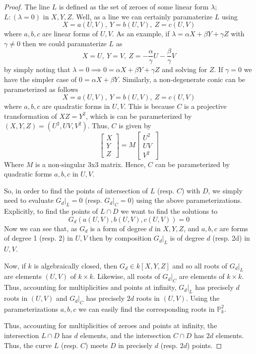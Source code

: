 \begin{proof}
The line $L$ is defined as the set of zeroes of some linear form $\lambda$; $L:(\lambda=0)$
in $X,Y,Z$. Well, as a line we can certainly paramaterize $L$ using 
\[
X=a(U,V),~Y=b(U,V),~Z=c(U,V)
\]
where $a, b, c$ are linear forms of $U,V$. As an example, if $\lambda = \alpha X + \beta Y + \gamma Z$
with $\gamma \ne 0$ then we could paramaterize $L$ as
\[
X = U,~Y=V,~Z=-\frac{\alpha}{\gamma}U - \frac{\beta}{\gamma}V
\]
by simply noting that $\lambda = 0 \implies 0 = \alpha X + \beta Y + \gamma Z$ and solving
for $Z$. If $\gamma = 0$ we have the simpler case of $0 = \alpha X + \beta Y$.
Similarly, a non-degenerate conic can be parameterized as follows
\[
X=a(U,V),~Y=b(U,V),~Z=c(U,V)
\]
where $a,b,c$ are quadratic forms in $U,V$. This is because $C$ is a projective
transformation of $XZ=Y^2$, which is can be parameterized by $(X,Y,Z) = (U^2,UV,V^2)$.
Thus, $C$ is given by 
\[
\begin{bmatrix}
X\\
Y\\
Z
\end{bmatrix}
=
M
\begin{bmatrix}
U^2\\
UV\\
V^2
\end{bmatrix}
\]
Where $M$ is a non-singular 3x3 matrix. Hence, $C$ can be parameterized by
quadratic forms $a, b, c$ in $U,V$.

So, in order to find the points of intersection of $L$ (resp. $C$) with $D$,
we simply need to evaluate $G_d|_L=0$ (resp. $G_d|_C=0$) using the above parameterizations.
Explicitly, to find the points of $L \cap D$ we want to find the solutions to
\[
	G_d(a(U,V),b(U,V),c(U,V)) = 0
\]
Now we can see that, as $G_d$ is a form of degree $d$ in $X,Y,Z$, and $a,b,c$ are forms
of degree 1 (resp. 2) in $U,V$ then by composition $G_d|_L$ is of degree $d$ (resp. 2d) in $U,V$.

Now, if $k$ is algebraically closed, then $G_d \in k[X,Y,Z]$ and so all roots of $G_d|_L$ are
elements $(U, V)$ of $k \times k$. Likewise, all roots of $G_d|_C$ are elements of $k \times k$.
Thus, accounting for multiplicities and points at infinity, $G_d|_L$ has precisely $d$ roots in 
$(U, V)$ and $G_d|_C$ has precisely $2d$ roots in $(U, V)$.
Using the parameterizations $a, b, c$ we can easily find the corresponding
roots in $\mathbb{P}^2_k$.

Thus, accounting for multiplicities of zeroes and points at infinity,
the intersection $L \cap D$ has $d$ elements, and the intersection
$C \cap D$ has $2d$ elements. Thus, the curve $L$ (resp. $C$) meets $D$ in
precisely $d$ (resp. $2d$) points.
\end{proof}


